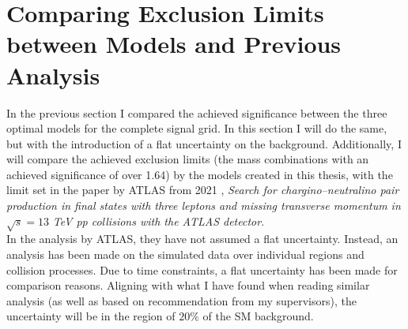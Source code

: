 \section{Comparing Exclusion Limits between Models and Previous Analysis}
In the previous section I compared the achieved significance between 
the three optimal models for the complete signal grid. In this section 
I will do the same, but with the introduction of a flat uncertainty on the background.
Additionally, I will compare the achieved exclusion limits (the mass combinations with an achieved 
significance of over 1.64) by the models created in this thesis, with the limit set in the paper by \ac{ATLAS} 
from 2021 \cite{atlas_search_2021}, \emph{Search for chargino--neutralino pair production in final states with 
three leptons and missing transverse momentum in} $\sqrt{s}=13$ \emph{TeV pp collisions with the ATLAS detector}.
\\
In the analysis by \ac{ATLAS}, they have not assumed a flat uncertainty. Instead, an analysis has been made on the simulated data 
over individual regions and collision processes. Due to time constraints, a flat uncertainty has been made for comparison 
reasons. Aligning with what I have found when reading similar analysis (as well as based on recommendation from my supervisors), 
the uncertainty will be in the region of $20\%$ of the \ac{SM} background.\\
